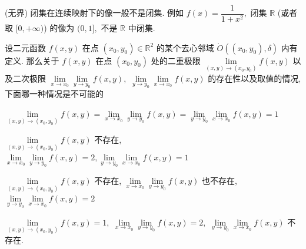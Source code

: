 \begin{solution}
  (无界) 闭集在连续映射下的像一般不是闭集. 例如 $f(x) = \dfrac{1}{1 + x^2},$ 闭集 $\mathbb{R}$ (或者取 $[0, +\infty)$) 的像为 $(0, 1],$ 不是 $\mathbb{R}$ 中闭集.
\end{solution}

\begin{question}
  设二元函数 $f(x, y)$ 在点 $(x_0, y_0) \in \mathbb{R}^2$ 的某个去心邻域 $\mathring{O}((x_0, y_0), \delta)$ 内有定义. 那么关于 $f(x, y)$ 在点 $(x_0, y_0)$ 处的二重极限 $\lim\limits_{(x,y)\to(x_0,y_0)} f(x,y)$ 以及二次极限 $\lim\limits_{x \to x_0} \lim\limits_{y \to y_0} f(x,y),$ $\lim\limits_{y \to y_0} \lim\limits_{x \to x_0} f(x,y)$ 的存在性以及取值的情况, 下面哪一种情况是不可能的 \paren[D]

  \begin{choices}
    \item $\lim\limits_{(x,y)\to(x_0,y_0)} f(x,y) = \lim\limits_{x \to x_0} \lim\limits_{y \to y_0} f(x,y) = \lim\limits_{y \to y_0} \lim\limits_{x \to x_0} f(x,y) = 1$
    \item $\lim\limits_{(x,y)\to(x_0,y_0)} f(x,y)$ 不存在, $\lim\limits_{x \to x_0} \lim\limits_{y \to y_0} f(x,y) = 2, \lim\limits_{y \to y_0} \lim\limits_{x \to x_0} f(x,y) = 1$
    \item $\lim\limits_{(x,y)\to(x_0,y_0)} f(x,y)$ 不存在, $\lim\limits_{x \to x_0} \lim\limits_{y \to y_0} f(x,y)$ 也不存在, $\lim\limits_{y \to y_0} \lim\limits_{x \to x_0} f(x,y) = 2$
    \item $\lim\limits_{(x,y)\to(x_0,y_0)} f(x,y) = 1,$ $\lim\limits_{x \to x_0} \lim\limits_{y \to y_0} f(x,y) = 2,$ $\lim\limits_{y \to y_0} \lim\limits_{x \to x_0} f(x,y)$ 不存在.
  \end{choices}
\end{question}

